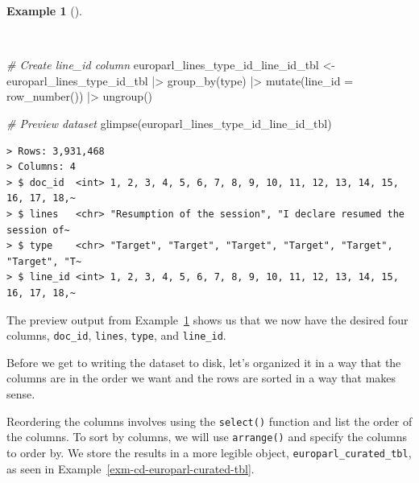 \documentclass[
  letterpaper,
  DIV=11,
  numbers=noendperiod]{scrreport}
\newenvironment{Shaded}{\begin{snugshade}}{\end{snugshade}}
\newcommand{\AttributeTok}[1]{\textcolor[rgb]{0.00,0.00,0.00}{#1}}
\newcommand{\CommentTok}[1]{\textcolor[rgb]{0.00,0.00,0.00}{\textit{#1}}}
\newcommand{\FunctionTok}[1]{\textcolor[rgb]{0.00,0.00,0.00}{#1}}
\newcommand{\NormalTok}[1]{\textcolor[rgb]{0.00,0.00,0.00}{#1}}
\newcommand{\OtherTok}[1]{\textcolor[rgb]{0.00,0.00,0.00}{#1}}
\newcommand{\SpecialCharTok}[1]{\textcolor[rgb]{0.00,0.00,0.00}{#1}}
\theoremstyle{definition}
\newtheorem{example}{Example}[chapter]
\theoremstyle{remark}
\begin{document}
\begin{example}[]\protect\hypertarget{exm-cd-europarl-text-lines-type-id-line-id-tbl}{}\label{exm-cd-europarl-text-lines-type-id-line-id-tbl}

~

\begin{Shaded}
\begin{Highlighting}[]
\CommentTok{\# Create \textasciigrave{}line\_id\textasciigrave{} column}
\NormalTok{europarl\_lines\_type\_id\_line\_id\_tbl }\OtherTok{\textless{}{-}} 
\NormalTok{  europarl\_lines\_type\_id\_tbl }\SpecialCharTok{|\textgreater{}} 
  \FunctionTok{group\_by}\NormalTok{(type) }\SpecialCharTok{|\textgreater{}} 
  \FunctionTok{mutate}\NormalTok{(}\AttributeTok{line\_id =} \FunctionTok{row\_number}\NormalTok{()) }\SpecialCharTok{|\textgreater{}} 
  \FunctionTok{ungroup}\NormalTok{()}

\CommentTok{\# Preview dataset}
\FunctionTok{glimpse}\NormalTok{(europarl\_lines\_type\_id\_line\_id\_tbl)}
\end{Highlighting}
\end{Shaded}

\begin{verbatim}
> Rows: 3,931,468
> Columns: 4
> $ doc_id  <int> 1, 2, 3, 4, 5, 6, 7, 8, 9, 10, 11, 12, 13, 14, 15, 16, 17, 18,~
> $ lines   <chr> "Resumption of the session", "I declare resumed the session of~
> $ type    <chr> "Target", "Target", "Target", "Target", "Target", "Target", "T~
> $ line_id <int> 1, 2, 3, 4, 5, 6, 7, 8, 9, 10, 11, 12, 13, 14, 15, 16, 17, 18,~
\end{verbatim}

\end{example}

The preview output from
Example~\ref{exm-cd-europarl-text-lines-type-id-line-id-tbl} shows us
that we now have the desired four columns, \texttt{doc\_id},
\texttt{lines}, \texttt{type}, and \texttt{line\_id}.

Before we get to writing the dataset to disk, let's organized it in a
way that the columns are in the order we want and the rows are sorted in
a way that makes sense.

Reordering the columns involves using the \texttt{select()} function and
list the order of the columns. To sort by columns, we will use
\texttt{arrange()} and specify the columns to order by. We store the
results in a more legible object, \texttt{europarl\_curated\_tbl}, as
seen in Example~\ref{exm-cd-europarl-curated-tbl}.
\end{document}
